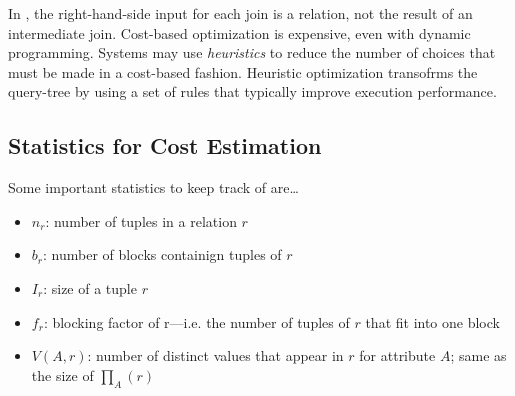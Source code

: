 \documentclass{article}
\begin{document}
In , the right-hand-side input for each join is a relation, not the result of an intermediate join. Cost-based optimization is expensive, even with dynamic programming. Systems may use \emph{heuristics} to reduce the number of choices that must be made in a cost-based fashion. Heuristic optimization transofrms the query-tree by using a set of rules that typically improve execution performance. 

\subsection{Statistics for Cost Estimation}

Some important statistics to keep track of are\dots 
\begin{itemize}
  \item $n_r$: number of tuples in a relation $r$ 
  \item $b_r$: number of blocks containign tuples of $r$
  \item $I_r$: size of a tuple $r$
  \item $f_r$: blocking factor of r---i.e. the number of tuples of $r$ that fit into one block 
  \item $V(A,r)$: number of distinct values that appear in $r$ for attribute $A$; same as the size of $\prod_A (r)$
\end{itemize}
\end{document}
